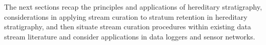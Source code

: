 The next sections recap the principles and applications of hereditary stratigraphy, considerations in applying stream curation to stratum retention in hereditary stratigraphy, and then situate stream curation procedures within existing data stream literature and consider applications in data loggers and sensor networks.
